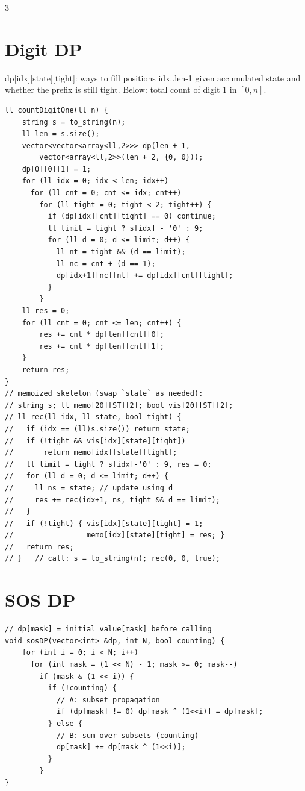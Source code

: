 \documentclass[10pt]{article}
\newcommand{\note}[1]{{\scriptsize #1}\par}
\begin{document}
\begin{multicols*}{3}
\section{Digit DP}
\note{dp[idx][state][tight]: ways to fill positions idx..len-1 given accumulated state and whether the prefix is still tight. Below: total count of digit 1 in $[0,n]$.}
\begin{lstlisting}
ll countDigitOne(ll n) {
    string s = to_string(n);
    ll len = s.size();
    vector<vector<array<ll,2>>> dp(len + 1,
        vector<array<ll,2>>(len + 2, {0, 0}));
    dp[0][0][1] = 1;
    for (ll idx = 0; idx < len; idx++)
      for (ll cnt = 0; cnt <= idx; cnt++)
        for (ll tight = 0; tight < 2; tight++) {
          if (dp[idx][cnt][tight] == 0) continue;
          ll limit = tight ? s[idx] - '0' : 9;
          for (ll d = 0; d <= limit; d++) {
            ll nt = tight && (d == limit);
            ll nc = cnt + (d == 1);
            dp[idx+1][nc][nt] += dp[idx][cnt][tight];
          }
        }
    ll res = 0;
    for (ll cnt = 0; cnt <= len; cnt++) {
        res += cnt * dp[len][cnt][0];
        res += cnt * dp[len][cnt][1];
    }
    return res;
}
// memoized skeleton (swap `state` as needed):
// string s; ll memo[20][ST][2]; bool vis[20][ST][2];
// ll rec(ll idx, ll state, bool tight) {
//   if (idx == (ll)s.size()) return state;
//   if (!tight && vis[idx][state][tight])
//       return memo[idx][state][tight];
//   ll limit = tight ? s[idx]-'0' : 9, res = 0;
//   for (ll d = 0; d <= limit; d++) {
//     ll ns = state; // update using d
//     res += rec(idx+1, ns, tight && d == limit);
//   }
//   if (!tight) { vis[idx][state][tight] = 1;
//                 memo[idx][state][tight] = res; }
//   return res;
// }   // call: s = to_string(n); rec(0, 0, true);
\end{lstlisting}

\section{SOS DP}
\begin{lstlisting}
// dp[mask] = initial_value[mask] before calling
void sosDP(vector<int> &dp, int N, bool counting) {
    for (int i = 0; i < N; i++)
      for (int mask = (1 << N) - 1; mask >= 0; mask--)
        if (mask & (1 << i)) {
          if (!counting) {
            // A: subset propagation
            if (dp[mask] != 0) dp[mask ^ (1<<i)] = dp[mask];
          } else {
            // B: sum over subsets (counting)
            dp[mask] += dp[mask ^ (1<<i)];
          }
        }
}
\end{lstlisting}


\end{multicols*}
\end{document}
